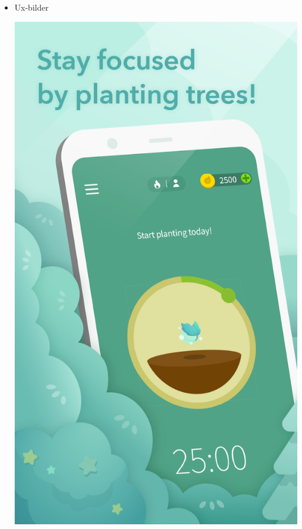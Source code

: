\documentclass[11pt]{article}
\begin{document}
\begin{itemize}
\item Ux-bilder
\begin{center}
\includegraphics[width=.9\linewidth]{./docs/1.png}
\end{center}
\begin{center}

\end{center}
\end{itemize}
\end{document}
